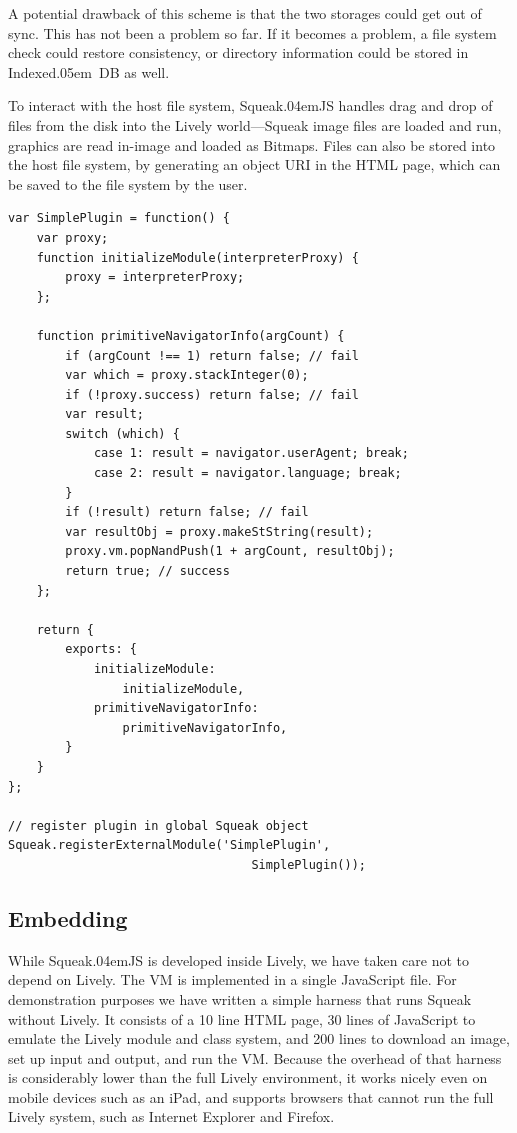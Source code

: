 \documentclass[natbib]{sigplanconf}
\newcommand*\SqueakJS{Squeak\texorpdfstring{\kern.04em}{}JS\xspace}
\newcommand*\JS{JavaScript\xspace}
\newcommand*\IndexedDB{\mbox{Indexed\kern.05em DB}\xspace}
\begin{document}
A potential drawback of this scheme is that the two storages could get
out of sync. This has not been a problem so far. If it becomes a
problem, a file system check could restore consistency, or directory
information could be stored in \IndexedDB as well.

To interact with the host file system, \SqueakJS handles drag and drop
of files from the disk into the Lively world---Squeak image files are
loaded and run, graphics are read in-image and loaded as Bitmaps.
Files can also be stored into the host file system, by generating an
object URI in the HTML page, which can be saved to the file system by
the user.

\begin{lstlisting}[float,caption={A simple Squeak Plugin},label=lst:simpleplugin]
var SimplePlugin = function() {
    var proxy;
    function initializeModule(interpreterProxy) {
        proxy = interpreterProxy;
    };

    function primitiveNavigatorInfo(argCount) {
        if (argCount !== 1) return false; // fail
        var which = proxy.stackInteger(0);
        if (!proxy.success) return false; // fail
        var result;
        switch (which) {
            case 1: result = navigator.userAgent; break;
            case 2: result = navigator.language; break;
        }
        if (!result) return false; // fail
        var resultObj = proxy.makeStString(result);
        proxy.vm.popNandPush(1 + argCount, resultObj);
        return true; // success
    };

    return {
        exports: {
            initializeModule:
                initializeModule,
            primitiveNavigatorInfo:
                primitiveNavigatorInfo,
        }
    }
};

// register plugin in global Squeak object
Squeak.registerExternalModule('SimplePlugin',
                                  SimplePlugin());

\end{lstlisting}

\subsection{Embedding}

While \SqueakJS is developed inside Lively, we have taken care not to
depend on Lively. The \ac{VM} is implemented in a single \JS file. For
demonstration purposes we have written a simple harness that runs
Squeak without Lively. It consists of a 10 line HTML page, 30 lines of
\JS to emulate the Lively module and class system, and 200
lines to download an image, set up input and output, and run the
\ac{VM}. Because the overhead of that harness is considerably lower than
the full Lively environment, it works nicely even on mobile devices
such as an iPad, and supports browsers that cannot run the full Lively
system, such as Internet Explorer and Firefox.
\end{document}
